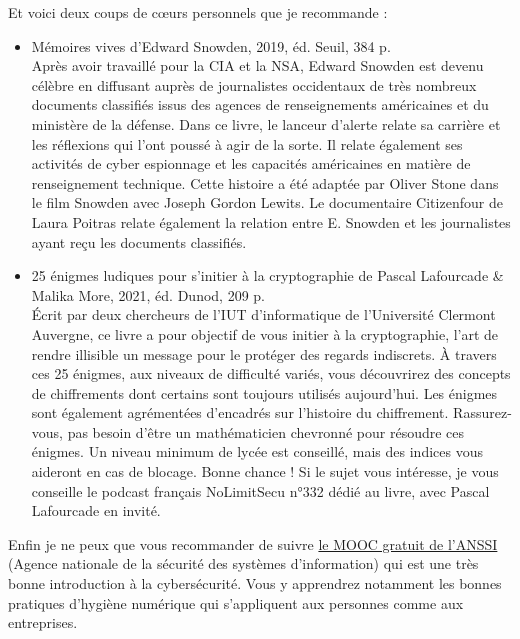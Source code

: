 \documentclass[a4paper]{article}
\begin{document}
Et voici deux coups de cœurs personnels que je recommande :
\\
\begin{itemize}
\\
\item Mémoires vives d’Edward Snowden, 2019, éd. Seuil, 384 p.
\\
Après avoir travaillé pour la CIA et la NSA, Edward Snowden est devenu célèbre en diffusant auprès de journalistes occidentaux de très nombreux documents classifiés issus des agences de renseignements américaines et du ministère de la défense. Dans ce livre, le lanceur d’alerte relate sa carrière et les réflexions qui l’ont poussé à agir de la sorte. Il relate également ses activités de cyber espionnage et les capacités américaines en matière de renseignement technique. Cette histoire a été adaptée par Oliver Stone dans le film Snowden avec Joseph Gordon Lewits. Le documentaire Citizenfour de Laura Poitras relate également la relation entre E. Snowden et les journalistes ayant reçu les documents classifiés. 
\\
\item 25 énigmes ludiques pour s’initier à la cryptographie de Pascal Lafourcade & Malika More, 2021, éd. Dunod, 209 p.
\\
Écrit par deux chercheurs de l’IUT d’informatique de l’Université Clermont Auvergne, ce livre a pour objectif de vous initier à la cryptographie, l’art de rendre illisible un message pour le protéger des regards indiscrets. À travers ces 25 énigmes, aux niveaux de difficulté variés, vous découvrirez des concepts de chiffrements dont certains sont toujours utilisés aujourd’hui. Les énigmes sont également agrémentées d’encadrés sur l’histoire du chiffrement. Rassurez-vous, pas besoin d’être un mathématicien chevronné pour résoudre ces énigmes. Un niveau minimum de lycée est conseillé, mais des indices vous aideront en cas de blocage. Bonne chance ! Si le sujet vous intéresse, je vous conseille le podcast français NoLimitSecu n°332 dédié au livre, avec Pascal Lafourcade en invité.
\\
\end{itemize}
Enfin je ne peux que vous recommander de suivre \href{https://secnumacademie.gouv.fr/}{le MOOC gratuit de l’ANSSI} (Agence nationale de la sécurité des systèmes d'information) qui est une très bonne introduction à la cybersécurité. Vous y apprendrez notamment les bonnes pratiques d’hygiène numérique qui s’appliquent aux personnes comme aux entreprises. 
\end{document}
